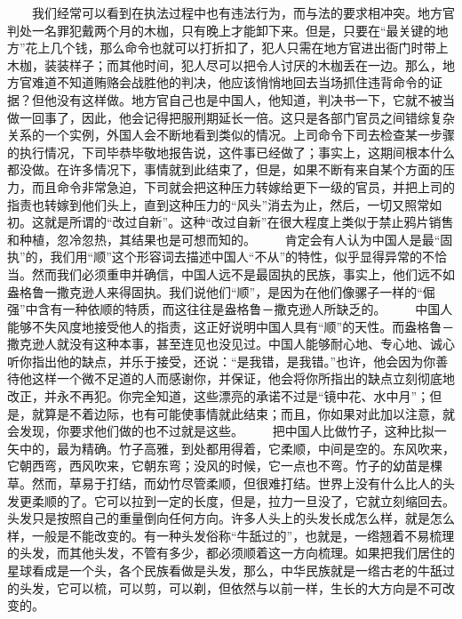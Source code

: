 \documentclass[12pt,oneside]{book}
\begin{document}
\begin{common-format}
　　我们经常可以看到在执法过程中也有违法行为，而与法的要求相冲突。地方官判处一名罪犯戴两个月的木枷，只有晚上才能卸下来。但是，只要在“最关键的地方”花上几个钱，那么命令也就可以打折扣了，犯人只需在地方官进出衙门时带上木枷，装装样子；而其他时间，犯人尽可以把令人讨厌的木枷丢在一边。那么，地方官难道不知道贿赂会战胜他的判决，他应该悄悄地回去当场抓住违背命令的证据？但他没有这样做。地方官自己也是中国人，他知道，判决书一下，它就不被当做一回事了，因此，他会记得把服刑期延长一倍。这只是各部门官员之间错综复杂关系的一个实例，外国人会不断地看到类似的情况。上司命令下司去检查某一步骤的执行情况，下司毕恭毕敬地报告说，这件事已经做了；事实上，这期间根本什么都没做。在许多情况下，事情就到此结束了，但是，如果不断有来自某个方面的压力，而且命令非常急迫，下司就会把这种压力转嫁给更下一级的官员，并把上司的指责也转嫁到他们头上，直到这种压力的“风头”消去为止，然后，一切又照常如初。这就是所谓的“改过自新”。这种“改过自新”在很大程度上类似于禁止鸦片销售和种植，忽冷忽热，其结果也是可想而知的。 
　　肯定会有人认为中国人是最“固执”的，我们用“顺”这个形容词去描述中国人“不从”的特性，似乎显得异常的不恰当。然而我们必须重申并确信，中国人远不是最固执的民族，事实上，他们远不如盎格鲁一撒克逊人来得固执。我们说他们“顺”，是因为在他们像骡子一样的“倔强”中含有一种依顺的特质，而这往往是盎格鲁－撒克逊人所缺乏的。 
　　中国人能够不失风度地接受他人的指责，这正好说明中国人具有“顺”的天性。而盎格鲁－撒克逊人就没有这种本事，甚至连见也没见过。中国人能够耐心地、专心地、诚心听你指出他的缺点，并乐于接受，还说：“是我错，是我错。”也许，他会因为你善待他这样一个微不足道的人而感谢你，并保证，他会将你所指出的缺点立刻彻底地改正，并永不再犯。你完全知道，这些漂亮的承诺不过是“镜中花、水中月”；但是，就算是不着边际，也有可能使事情就此结束；而且，你如果对此加以注意，就会发现，你要求他们做的也不过就是这些。 
　　把中国人比做竹子，这种比拟一矢中的，最为精确。竹子高雅，到处都用得着，它柔顺，中间是空的。东风吹来，它朝西弯，西风吹来，它朝东弯；没风的时候，它一点也不弯。竹子的幼苗是棵草。然而，草易于打结，而幼竹尽管柔顺，但很难打结。世界上没有什么比人的头发更柔顺的了。它可以拉到一定的长度，但是，拉力一旦没了，它就立刻缩回去。头发只是按照自己的重量倒向任何方向。许多人头上的头发长成怎么样，就是怎么样，一般是不能改变的。有一种头发俗称“牛舐过的”，也就是，一绺翘着不易梳理的头发，而其他头发，不管有多少，都必须顺着这一方向梳理。如果把我们居住的星球看成是一个头，各个民族看做是头发，那么，中华民族就是一绺古老的牛舐过的头发，它可以梳，可以剪，可以剃，但依然与以前一样，生长的大方向是不可改变的。


\end{common-format}
\end{document}
